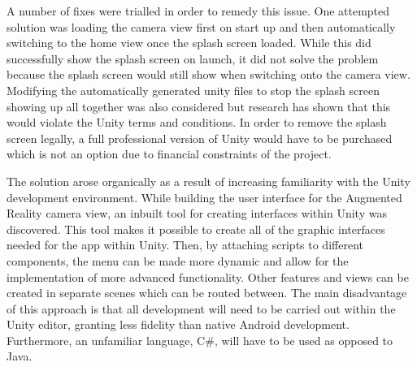 \documentclass{l4proj}
\begin{document}
A number of fixes were trialled in order to remedy this issue. One attempted solution was loading the camera view first on start up and then automatically switching to the home view once the splash screen loaded. While this did successfully show the splash screen on launch, it did not solve the problem because the splash screen would still show when switching onto the camera view. Modifying the automatically generated unity files to stop the splash screen showing up all together was also considered but research has shown that this would violate the Unity terms and conditions. In order to remove the splash screen legally, a full professional version of Unity would have to be purchased\cite{unity_unity_nodate} which is not an option due to financial constraints of the project.

The solution arose organically as a result of increasing familiarity with the Unity development environment. While building the user interface for the Augmented Reality camera view, an inbuilt tool for creating interfaces within Unity was discovered. This tool makes it possible to create all of the graphic interfaces needed for the app within Unity. Then, by attaching scripts to different components, the menu can be made more dynamic and allow for the implementation of more advanced functionality. Other features and views can be created in separate scenes which can be routed between. The main disadvantage of this approach is that all development will need to be carried out within the Unity editor, granting less fidelity than native Android development. Furthermore, an unfamiliar language, C\#, will have to be used as opposed to Java.
\end{document}
